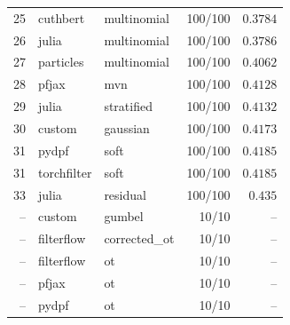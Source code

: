 \begin{table}[!htbp]
\begin{tabular}{rllrr}
25 & cuthbert & multinomial & 100/100 & $0.3784$ \\
26 & julia & multinomial & 100/100 & $0.3786$ \\
27 & particles & multinomial & 100/100 & $0.4062$ \\
28 & pfjax & mvn & 100/100 & $0.4128$ \\
29 & julia & stratified & 100/100 & $0.4132$ \\
30 & custom & gaussian & 100/100 & $0.4173$ \\
31 & pydpf & soft & 100/100 & $0.4185$ \\
31 & torchfilter & soft & 100/100 & $0.4185$ \\
33 & julia & residual & 100/100 & $0.435$ \\
-- & custom & gumbel & 10/10 & $\text{--}$ \\
-- & filterflow & corrected\_ot & 10/10 & $\text{--}$ \\
-- & filterflow & ot & 10/10 & $\text{--}$ \\
-- & pfjax & ot & 10/10 & $\text{--}$ \\
-- & pydpf & ot & 10/10 & $\text{--}$ \\
\bottomrule
\end{tabular}
\end{table}


